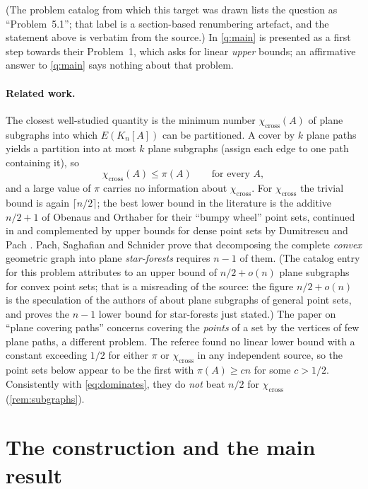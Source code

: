 \documentclass[11pt,a4paper]{article}
\theoremstyle{plain}
\theoremstyle{definition}
\theoremstyle{remark}
\newcommand{\pipath}{\pi}
\newcommand{\chicross}{\chi_{\mathrm{cross}}}
\begin{document}
(The problem catalog from which this target was drawn lists the question as ``Problem~5.1''; that label is a section-based renumbering artefact, and the statement above is verbatim from the source.) In \cite{DPSS26} \cref{q:main} is presented as a first step towards their Problem~1, which asks for linear \emph{upper} bounds; an affirmative answer to \cref{q:main} says nothing about that problem.

\paragraph{Related work.} The closest well-studied quantity is the minimum number $\chicross(A)$ of plane subgraphs into which $E(K_n[A])$ can be partitioned. A cover by $k$ plane paths yields a partition into at most $k$ plane subgraphs (assign each edge to one path containing it), so
\begin{equation}\label{eq:dominates}
 \chicross(A)\le\pipath(A)\qquad\text{for every }A,
\end{equation}
and a large value of $\pipath$ carries no information about $\chicross$. For $\chicross$ the trivial bound is again $\lceil n/2\rceil$; the best lower bound in the literature is the additive $n/2+1$ of Obenaus and Orthaber \cite{OO21} for their ``bumpy wheel'' point sets, continued in \cite{AOO22} and complemented by upper bounds for dense point sets by Dumitrescu and Pach \cite{DP24}. Pach, Saghafian and Schnider \cite{PSS23} prove that decomposing the complete \emph{convex} geometric graph into plane \emph{star-forests} requires $n-1$ of them. (The catalog entry for this problem attributes to \cite{PSS23} an upper bound of $n/2+o(n)$ plane subgraphs for convex point sets; that is a misreading of the source: the figure $n/2+o(n)$ is the speculation of the authors of \cite{DPSS26} about plane subgraphs of general point sets, and \cite{PSS23} proves the $n-1$ lower bound for star-forests just stated.) The paper \cite{AAB25} on ``plane covering paths'' concerns covering the \emph{points} of a set by the vertices of few plane paths, a different problem. The referee found no linear lower bound with a constant exceeding $1/2$ for either $\pipath$ or $\chicross$ in any independent source, so the point sets below appear to be the first with $\pipath(A)\ge cn$ for some $c>1/2$. Consistently with \eqref{eq:dominates}, they do \emph{not} beat $n/2$ for $\chicross$ (\cref{rem:subgraphs}).

\section{The construction and the main result}\label{sec:main}
\end{document}
